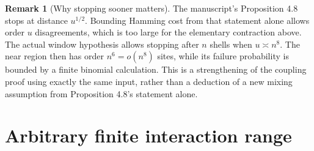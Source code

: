 \documentclass[11pt]{amsart}
\theoremstyle{definition}
\newtheorem{remark}[theorem]{Remark}
\newcommand{\1}{\mathbf 1}
\begin{document}
\begin{remark}[Why stopping sooner matters]
\label{rem:stopping}
The manuscript's Proposition 4.8 stops at distance $u^{1/2}$. Bounding
Hamming cost from that statement alone allows order $u$ disagreements,
which is too large for the elementary contraction above. The actual window
hypothesis allows stopping after $n$ shells when $u\asymp n^8$.
The near region then has order $n^6=o(n^8)$ sites, while its failure
probability is bounded by a finite binomial calculation. This is a
strengthening of the coupling proof using exactly the same input, rather
than a deduction of a new mixing assumption from Proposition 4.8's
statement alone.
\end{remark}

\section{Arbitrary finite interaction range}
\label{sec:range}
\end{document}
